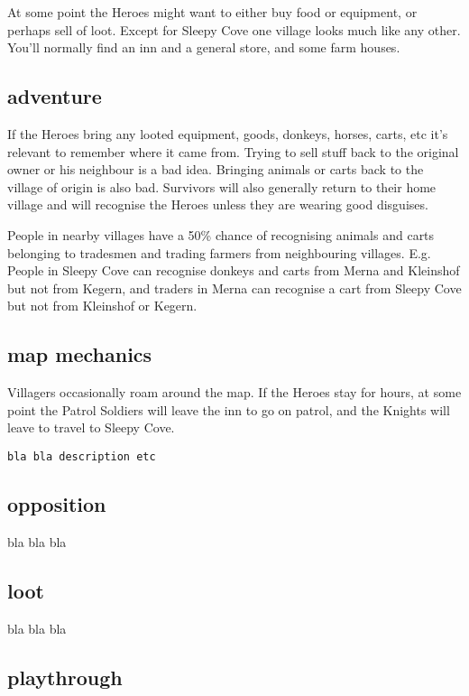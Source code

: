 At some point the Heroes might want to either buy food or equipment, or perhaps sell of loot. Except for Sleepy Cove one village looks much like any other. You'll normally find an inn and a general store, and some farm houses.


\subsection*{adventure}

If the Heroes bring any looted equipment, goods, donkeys, horses, carts, etc it's relevant to remember where it came from. Trying to sell stuff back to the original owner or his neighbour is a bad idea. Bringing animals or carts back to the village of origin is also bad. Survivors will also generally return to their home village and will recognise the Heroes unless they are wearing good disguises.

People in nearby villages have a 50\% chance of recognising animals and carts belonging to tradesmen and trading farmers from neighbouring villages. E.g. People in Sleepy Cove can recognise donkeys and carts from Merna and Kleinshof but not from Kegern, and traders in Merna can recognise a cart from Sleepy Cove but not from Kleinshof or Kegern.


\subsection*{map mechanics}

Villagers occasionally roam around the map. If the Heroes stay for hours, at some point the Patrol Soldiers will leave the inn to go on patrol, and the Knights will leave to travel to Sleepy Cove.

\small \begin{verbatim}
bla bla description etc
\end{verbatim} \normalsize


\subsection*{opposition}

bla bla bla


\subsection*{loot}

bla bla bla


\subsection*{playthrough}

